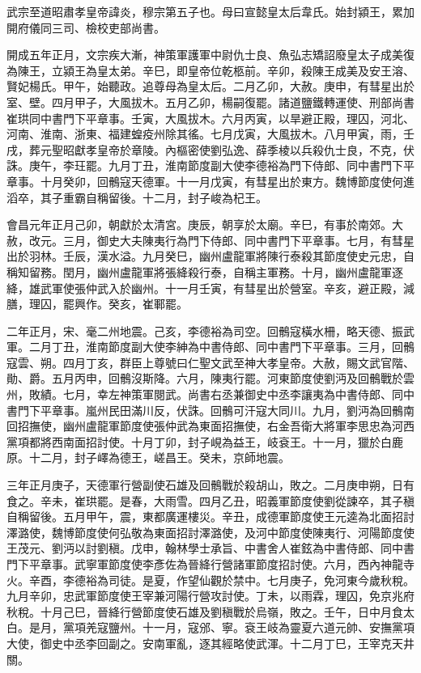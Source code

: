 \begin{pinyinscope}
 武宗至道昭肅孝皇帝諱炎，穆宗第五子也。母曰宣懿皇太后韋氏。始封潁王，累加開府儀同三司、檢校吏部尚書。



 開成五年正月，文宗疾大漸，神策軍護軍中尉仇士良、魚弘志矯詔廢皇太子成美復為陳王，立潁王為皇太弟。辛巳，即皇帝位乾柩前。辛卯，殺陳王成美及安王溶、賢妃楊氏。甲午，始聽政。追尊母為皇太后。二月乙卯，大赦。庚申，有彗星出於室、壁。四月甲子，大風拔木。五月乙卯，楊嗣復罷。諸道鹽鐵轉運使、刑部尚書崔珙同中書門下平章事。壬寅，大風拔木。六月丙寅，以旱避正殿，理囚，河北、河南、淮南、浙東、福建蝗疫州除其徭。七月戊寅，大風拔木。八月甲寅，雨，壬戌，葬元聖昭獻孝皇帝於章陵。內樞密使劉弘逸、薛季棱以兵殺仇士良，不克，伏誅。庚午，李玨罷。九月丁丑，淮南節度副大使李德裕為門下侍郎、同中書門下平章事。十月癸卯，回鶻寇天德軍。十一月戊寅，有彗星出於東方。魏博節度使何進滔卒，其子重霸自稱留後。十二月，封子峻為杞王。



 會昌元年正月己卯，朝獻於太清宮。庚辰，朝享於太廟。辛巳，有事於南郊。大赦，改元。三月，御史大夫陳夷行為門下侍郎、同中書門下平章事。七月，有彗星出於羽林。壬辰，漢水溢。九月癸巳，幽州盧龍軍將陳行泰殺其節度使史元忠，自稱知留務。閏月，幽州盧龍軍將張絳殺行泰，自稱主軍務。十月，幽州盧龍軍逐絳，雄武軍使張仲武入於幽州。十一月壬寅，有彗星出於營室。辛亥，避正殿，減膳，理囚，罷興作。癸亥，崔鄆罷。



 二年正月，宋、毫二州地震。己亥，李德裕為司空。回鶻寇橫水柵，略天德、振武軍。二月丁丑，淮南節度副大使李紳為中書侍郎、同中書門下平章事。三月，回鶻寇雲、朔。四月丁亥，群臣上尊號曰仁聖文武至神大孝皇帝。大赦，賜文武官階、勛、爵。五月丙申，回鶻沒斯降。六月，陳夷行罷。河東節度使劉沔及回鶻戰於雲州，敗績。七月，幸左神策軍閱武。尚書右丞兼御史中丞李讓夷為中書侍郎、同中書門下平章事。嵐州民田滿川反，伏誅。回鶻可汗寇大同川。九月，劉沔為回鶻南回招撫使，幽州盧龍軍節度使張仲武為東面招撫使，右金吾衛大將軍李思忠為河西黨項都將西南面招討使。十月丁卯，封子峴為益王，岐袞王。十一月，獵於白鹿原。十二月，封子嶧為德王，嵯昌王。癸未，京師地震。



 三年正月庚子，天德軍行營副使石雄及回鶻戰於殺胡山，敗之。二月庚申朔，日有食之。辛未，崔珙罷。是春，大雨雪。四月乙丑，昭義軍節度使劉從諫卒，其子稹自稱留後。五月甲午，震，東都廣運樓災。辛丑，成德軍節度使王元逵為北面招討澤潞使，魏博節度使何弘敬為東面招討澤潞使，及河中節度使陳夷行、河陽節度使王茂元、劉沔以討劉稹。戊申，翰林學士承旨、中書舍人崔鉉為中書侍郎、同中書門下平章事。武寧軍節度使李彥佐為晉絳行營諸軍節度招討使。六月，西內神龍寺火。辛酉，李德裕為司徒。是夏，作望仙觀於禁中。七月庚子，免河東今歲秋稅。九月辛卯，忠武軍節度使王宰兼河陽行營攻討使。丁未，以雨霖，理囚，免京兆府秋稅。十月己巳，晉絳行營節度使石雄及劉稹戰於烏嶺，敗之。壬午，日中月食太白。是月，黨項羌寇鹽州。十一月，寇邠、寧。袞王岐為靈夏六道元帥、安撫黨項大使，御史中丞李回副之。安南軍亂，逐其經略使武渾。十二月丁巳，王宰克天井關。




\end{pinyinscope}
